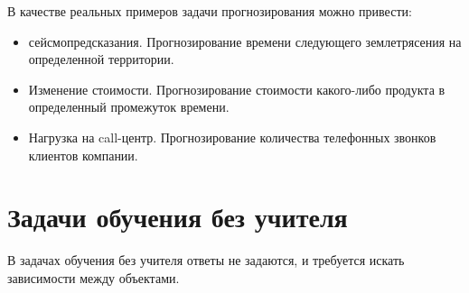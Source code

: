 \begin{itemize}
    В качестве реальных примеров задачи прогнозирования можно привести:
    \begin{itemize}
      \item сейсмопредсказания. Прогнозирование времени следующего землетрясения на определенной
        территории.
      \item Изменение стоимости. Прогнозирование стоимости какого-либо продукта в определенный
        промежуток времени.
      \item Нагрузка на call-центр. Прогнозирование количества телефонных звонков клиентов компании.
    \end{itemize}
\end{itemize}

\section{Задачи обучения без учителя}
В задачах обучения без учителя ответы не задаются, и требуется
искать зависимости между объектами.

